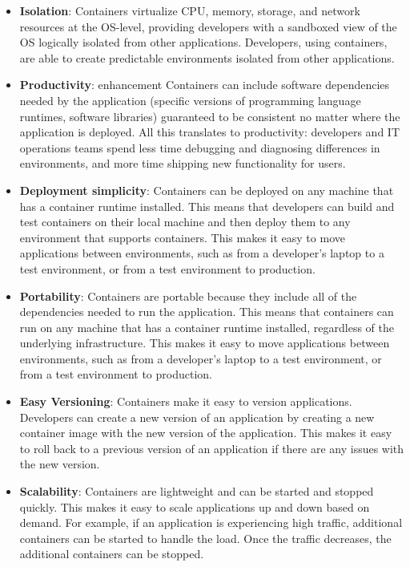 \begin{itemize}
    \item \textbf{Isolation}: Containers virtualize CPU, memory, storage, and network resources at
    the OS-level, providing developers with a sandboxed view of
    the OS logically isolated from other applications. Developers, using containers, are
    able to create predictable environments isolated from other applications.
    \item \textbf{Productivity}: enhancement Containers can include software dependencies
    needed by the application (specific versions of
    programming language runtimes, software libraries) guaranteed to be consistent no
    matter where the application is deployed. All this translates to productivity:
    developers and IT operations teams spend less time debugging and diagnosing
    differences in environments, and more time
    shipping new functionality for users.
    \item \textbf{Deployment simplicity}: Containers can be deployed on any machine that has a container runtime installed. This means that developers can build and test containers on their local machine and then deploy them to any environment that supports containers. This makes it easy to move applications between environments, such as from a developer’s laptop to a test environment, or from a test environment to production.
    \item \textbf{Portability}: Containers are portable because they include all of the dependencies needed to run the application. This means that containers can run on any machine that has a container runtime installed, regardless of the underlying infrastructure. This makes it easy to move applications between environments, such as from a developer’s laptop to a test environment, or from a test environment to production.
    \item \textbf{Easy Versioning}: Containers make it easy to version applications. Developers can create a new version of an application by creating a new container image with the new version of the application. This makes it easy to roll back to a previous version of an application if there are any issues with the new version.
    \item \textbf{Scalability}: Containers are lightweight and can be started and stopped quickly. This makes it easy to scale applications up and down based on demand. For example, if an application is experiencing high traffic, additional containers can be started to handle the load. Once the traffic decreases, the additional containers can be stopped.

\end{itemize}
